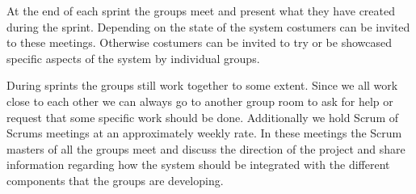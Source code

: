 At the end of each sprint the groups meet and present what they have created during the sprint.
Depending on the state of the system costumers can be invited to these meetings.
Otherwise costumers can be invited to try or be showcased specific aspects of the system by individual groups.

During sprints the groups still work together to some extent.
Since we all work close to each other we can always go to another group room to ask for help or request that some specific work should be done.
Additionally we hold Scrum of Scrums meetings at an approximately weekly rate.
In these meetings the Scrum masters of all the groups meet and discuss the direction of the project and share information regarding how the system should be integrated with the different components that the groups are developing.